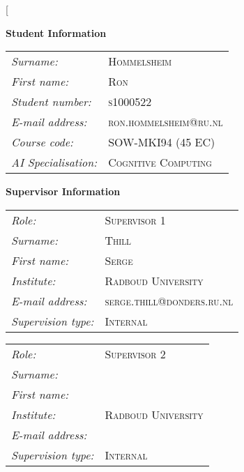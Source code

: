 \documentclass[twocolumn]{article}
\title{\thesistitle}
\date{\thesisdate}
\begin{document}
\twocolumn[
  \begin{@twocolumnfalse}
    
    \end{@twocolumnfalse}
    \textbf{Student Information} \\

    \begin{tabular}{L{3cm}l}
                \emph{Surname:} & \textsc{Hommelsheim} \\
                \emph{First name:} & \textsc{Ron} \\
                \emph{Student number:} & \textsc{s1000522} \\
                \emph{E-mail address:} & \textsc{ron.hommelsheim@ru.nl} \\
                \emph{Course code:} & \textsc{SOW-MKI94 (45 EC)} \\
                \emph{AI Specialisation:} & \textsc{Cognitive Computing} \\
        \end{tabular}
	
  \vspace{1cm}
  \textbf{Supervisor Information} \\

    \begin{tabular}{L{3cm}l}
            \emph{Role:} & \textsc{Supervisor 1} \\
            \emph{Surname:} & \textsc{Thill} \\
            \emph{First name:} & \textsc{Serge} \\
            \emph{Institute:} & \textsc{Radboud University} \\
            \emph{E-mail address:} & \textsc{serge.thill@donders.ru.nl} \\
            \emph{Supervision type:} & \textsc{Internal} \\
    \end{tabular}

    \vspace{0.5cm}

    \begin{tabular}{L{3cm}l}
            \emph{Role:} & \textsc{Supervisor 2} \\
            \emph{Surname:} & \textsc{} \\
            \emph{First name:} & \textsc{} \\
            \emph{Institute:} & \textsc{Radboud University} \\
            \emph{E-mail address:} & \textsc{} \\
            \emph{Supervision type:} & \textsc{Internal} \\
    \end{tabular}
\end{document}
